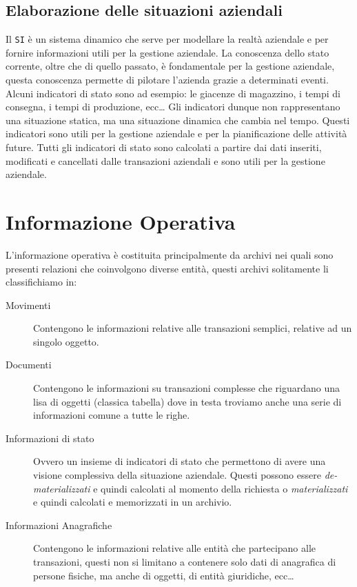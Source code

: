     \subsection{Elaborazione delle situazioni aziendali}
        Il \texttt{SI} è un sistema dinamico che serve per modellare la realtà aziendale e per fornire informazioni utili per la gestione aziendale. La conoscenza dello stato corrente, oltre che di quello passato, è fondamentale per la gestione aziendale, questa conoscenza permette di pilotare l'azienda grazie a determinati eventi. Alcuni indicatori di stato sono ad esempio: le giacenze di magazzino, i tempi di consegna, i tempi di produzione, ecc\dots\newline
        Gli indicatori dunque non rappresentano una situazione statica, ma una situazione dinamica che cambia nel tempo. Questi indicatori sono utili per la gestione aziendale e per la pianificazione delle attività future. Tutti gli indicatori di stato sono calcolati a partire dai dati inseriti, modificati e cancellati dalle transazioni aziendali e sono utili per la gestione aziendale.
\section{Informazione Operativa}
    L'informazione operativa è costituita principalmente da archivi nei quali sono presenti relazioni che coinvolgono diverse entità, questi archivi solitamente li classifichiamo in:
    \begin{description}
        \item[Movimenti] Contengono le informazioni relative alle transazioni semplici, relative ad un singolo oggetto.
        \item[Documenti] Contengono le informazioni su transazioni complesse che riguardano una lisa di oggetti (classica tabella) dove in testa troviamo anche una serie di informazioni comune a tutte le righe.
        \item[Informazioni di stato] Ovvero un insieme di indicatori di stato che permettono di avere una visione complessiva della situazione aziendale. Questi possono essere \textit{de-materializzati} e quindi calcolati al momento della richiesta o \textit{materializzati} e quindi calcolati e memorizzati in un archivio.
        \item[Informazioni Anagrafiche] Contengono le informazioni relative alle entità che partecipano alle transazioni, questi non si limitano a contenere solo dati di anagrafica di persone fisiche, ma anche di oggetti, di entità giuridiche, ecc\dots
    \end{description}
